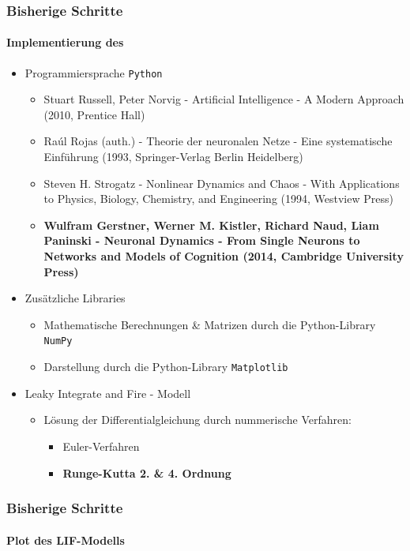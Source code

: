 \documentclass[10pt,t,aspectratio=1610]{beamer}
\newcommand{\code}[1]{\colorbox{light-gray}{\texttt{#1}}}
\begin{document}

\begin{frame}[fragile]
  \frametitle{Bisherige Schritte}
  \framesubtitle{Implementierung des }

  \begin{itemize}
  	\item Programmiersprache \code{Python}
  	\begin{itemize}
  		\item Stuart Russell, Peter Norvig - Artificial Intelligence - A Modern Approach (2010, Prentice Hall)
  		\item Raúl Rojas (auth.) - Theorie der neuronalen Netze - Eine systematische Einführung (1993, Springer-Verlag Berlin Heidelberg)
  		\item Steven H. Strogatz - Nonlinear Dynamics and Chaos - With Applications to Physics, Biology, Chemistry, and Engineering  (1994, Westview Press)
  		\item \textbf{Wulfram Gerstner, Werner M. Kistler, Richard Naud, Liam Paninski - Neuronal Dynamics - From Single Neurons to Networks and Models of Cognition (2014, Cambridge University Press)
  		}
  	\end{itemize}
  	\item Zusätzliche Libraries
  	\begin{itemize}
  		\item Mathematische Berechnungen \& Matrizen durch die Python-Library \code{NumPy}
  		\item Darstellung durch die Python-Library \code{Matplotlib}
  	\end{itemize}
  	\item Leaky Integrate and Fire - Modell
  	\begin{itemize}
  		\item Lösung der Differentialgleichung durch nummerische Verfahren:
  		  \begin{itemize}
  		  	\item Euler-Verfahren
  		  	\item \textbf{Runge-Kutta 2. \& 4. Ordnung}
  		  \end{itemize}
  	\end{itemize}
  \end{itemize}
	

\end{frame}


\begin{frame}
	\frametitle{Bisherige Schritte}
	\framesubtitle{Plot des LIF-Modells}
	
	\begin{center}
	  \scalebox{0.2}{}
	  \qquad
	  \scalebox{0.2}{}
	\end{center}
\end{frame}
\end{document}
